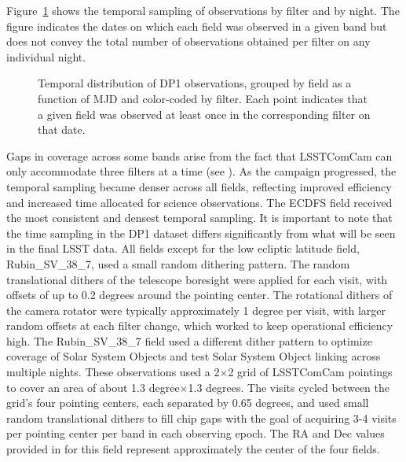 
%
Figure~\ref{fig:target_fields_temporal_sampling} shows the temporal sampling of observations by filter and by night.
The figure indicates the dates on which each field was observed in a given band but does not convey the total number of observations obtained per filter on any individual night.
\begin{figure}[htb!]
\centering
{}
\caption{Temporal distribution of \gls{DP1} observations, grouped by field as a function of \gls{MJD} and color-coded by filter. Each point indicates that a given field was observed at least once in the corresponding filter on that date.}
\label{fig:target_fields_temporal_sampling}
\end{figure}
Gaps in coverage across some bands arise from the fact that \gls{LSSTComCam} can only accommodate three filters at a time (see ).
As the campaign progressed, the temporal sampling became denser across all fields, reflecting improved efficiency and increased time allocated for science observations.
The \gls{ECDFS} field received the most consistent and densest temporal sampling.
It is important to note that the time sampling in the \gls{DP1} dataset differs significantly from what will be seen in the final \gls{LSST} data.
%
All fields except for the low ecliptic latitude field, Rubin\_SV\_38\_7, used a small random dithering pattern.
The random translational dithers of the telescope boresight were applied for each visit, with offsets of up to 0.2 degrees around the pointing center.
The rotational dithers of the camera rotator were typically approximately 1 degree per visit, with larger random offsets at each filter change, which worked to keep operational efficiency high.
The Rubin\_SV\_38\_7 field used a different dither pattern to optimize coverage of Solar System Objects and test Solar System Object linking across multiple nights.
These observations used a 2$\times$2 grid of \gls{LSSTComCam} pointings to cover an area of about 1.3 degree$\times$1.3 degrees.
The visits cycled between the grid's four pointing centers, each separated by 0.65  degrees, and used small random translational dithers to fill chip gaps with the goal of acquiring 3-4 visits per pointing center per band in each observing epoch.
The RA and Dec values provided in  for this field represent approximately the center of the four fields.

